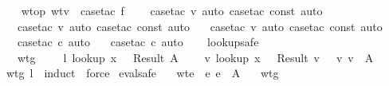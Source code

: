 \begin{isabellebody}
\isadelimproof
\ \ \endisadelimproof
\isatagproof
{}\isamarkupfalse \ wtop\ wtv\ \isamarkupfalse \ {\isacharparenleft}case{\isacharunderscore}tac\ f{\isacharparenright}\ \isanewline
\ \ \isamarkupfalse \ {\isacharparenleft}case{\isacharunderscore}tac\ v{\isacharcomma}\ auto{\isacharcomma}\ case{\isacharunderscore}tac\ const{\isacharcomma}\ auto{\isacharparenright}\isanewline
\ \ \isamarkupfalse \ {\isacharparenleft}case{\isacharunderscore}tac\ v{\isacharcomma}\ auto{\isacharcomma}\ case{\isacharunderscore}tac\ const{\isacharcomma}\ auto{\isacharparenright}\isanewline
\ \ \isamarkupfalse \ {\isacharparenleft}case{\isacharunderscore}tac\ v{\isacharcomma}\ auto{\isacharcomma}\ case{\isacharunderscore}tac\ const{\isacharcomma}\ auto{\isacharparenright}\isanewline
\ \ \isamarkupfalse \ {\isacharparenleft}case{\isacharunderscore}tac\ c{\isacharcomma}\ auto{\isacharparenright}\isanewline
\ \ \isamarkupfalse \ {\isacharparenleft}case{\isacharunderscore}tac\ c{\isacharcomma}\ auto{\isacharparenright}\isanewline
\ \ \isamarkupfalse \endisatagproof
{\isafoldproof}\isadelimproof
\isanewline
\endisadelimproof
\isanewline
{}\isamarkupfalse \ lookup{\isacharunderscore}safe{\isacharcolon}\ \isanewline
\ \ \ wtg{\isacharcolon}\ {\isachardoublequoteopen}{\isasymGamma}{\isacharsemicolon}{\isasymSigma}\ {\isasymturnstile}\ {\isasymrho}{\isachardoublequoteclose}\ \ l{\isacharcolon}\ {\isachardoublequoteopen}lookup\ x\ {\isasymGamma}\ {\isacharequal}\ Result\ A{\isachardoublequoteclose}\isanewline
\ \ \ {\isachardoublequoteopen}{\isasymexists}\ v{\isachardot}\ lookup\ x\ {\isasymrho}\ {\isacharequal}\ Result\ v\ {\isasymand}\ {\isasymSigma}\ {\isasymturnstile}v\ v\ {\isacharcolon}\ A{\isachardoublequoteclose}\isanewline
\isadelimproof
\ \ \endisadelimproof
\isatagproof
{}\isamarkupfalse \ wtg\ l\ \isamarkupfalse \ {\isacharparenleft}induct\ {\isasymrho}{\isacharparenright}\ force{\isacharplus}\endisatagproof
{\isafoldproof}\isadelimproof
\isanewline
\endisadelimproof
\isanewline
{}\isamarkupfalse \ eval{\isacharunderscore}safe{\isacharcolon}\isanewline
\ \ \ wte{\isacharcolon}\ {\isachardoublequoteopen}{\isasymGamma}\ {\isasymturnstile}\isactrlisub e\ e\ {\isacharcolon}\ A{\isachardoublequoteclose}\isanewline
\ \ \ wtg{\isacharcolon}\ {\isachardoublequoteopen}{\isasymGamma}{\isacharsemicolon}{\isasymSigma}\ {\isasymturnstile}\ {\isasymrho}{\isachardoublequoteclose}\isanewline

\end{isabellebody}
